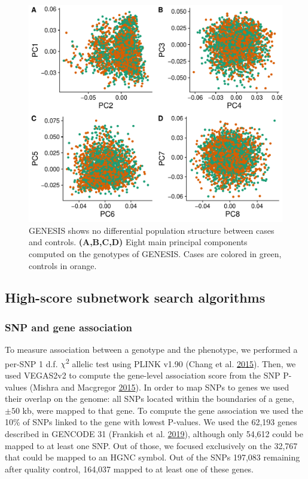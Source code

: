 \documentclass[
  11pt,
]{env/yjiao}
\begin{document}
\begin{figure}
\centering
\includegraphics{fig/sfigure_1.pdf}
\caption{\label{fig:pcs}GENESIS shows no differential population structure between cases and controls. \textbf{(A,B,C,D)} Eight main principal components computed on the genotypes of GENESIS. Cases are colored in green, controls in orange.}
\end{figure}

\hypertarget{sec:org6ced6c9}{%
\subsection{High-score subnetwork search algorithms}\label{sec:org6ced6c9}}

\hypertarget{methods:node-score}{%
\subsubsection{SNP and gene association}\label{methods:node-score}}

To measure association between a genotype and the phenotype, we
performed a per-SNP 1 d.f. \(\chi\)\textsuperscript{2} allelic test using PLINK v1.90
(Chang et al. \protect\hyperlink{ref-chang_second-generation_2015}{2015}). Then, we used VEGAS2v2 to compute the
gene-level association score from the SNP P-values (Mishra and Macgregor \protect\hyperlink{ref-mishra_vegas2:_2015}{2015}).
In order to map SNPs to genes we used their overlap on the
genome: all SNPs located within the boundaries of a gene, \(\pm 50\) kb, were
mapped to that gene. To compute the gene association we used the 10\% of
SNPs linked to the gene with lowest P-values. We used the 62,193 genes
described in GENCODE 31 (Frankish et al. \protect\hyperlink{ref-frankish_gencode_2019}{2019}), although only 54,612
could be mapped to at least one SNP. Out of those, we focused
exclusively on the 32,767 that could be mapped to an HGNC symbol. Out of
the SNPs 197,083 remaining after quality control, 164,037 mapped to at
least one of these genes.
\end{document}
